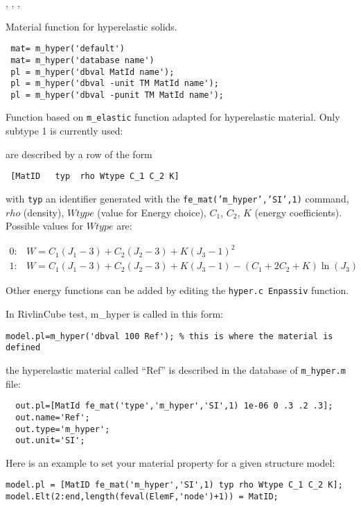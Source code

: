 
  , , \femat, \pheat


 Material function for hyperelastic solids.

\rsyntax\begin{verbatim}
 mat= m_hyper('default') 
 mat= m_hyper('database name') 
 pl = m_hyper('dbval MatId name');
 pl = m_hyper('dbval -unit TM MatId name');
 pl = m_hyper('dbval -punit TM MatId name');
\end{verbatim}


Function based on {\tt m\_elastic} function adapted for hyperelastic material. Only subtype 1 is currently used:


 are described by a row of the form

\begin{verbatim}
 [MatID   typ  rho Wtype C_1 C_2 K]
\end{verbatim}


\noindent with {\tt typ} an identifier generated with the {\tt fe\_mat('m\_hyper','SI',1)} command, $rho$ (density), $Wtype$ (value for Energy choice), $C_1$, $C_2$, $K$ (energy coefficients).\\
\noindent Possible values for $Wtype$ are:

$$
\begin{array}{ll}
0: & W = C_1(J_1-3) + C_2(J_2-3) + K(J_3-1)^2\\
1: & W = C_1(J_1-3) + C_2(J_2-3) + K(J_3-1) - (C_1 + 2C_2 + K)\ln(J_3)
\end{array}
$$

Other energy functions can be added by editing the {\tt hyper.c Enpassiv} function.

In RivlinCube test, m\_hyper is called in this form:
\begin{verbatim}
model.pl=m_hyper('dbval 100 Ref'); % this is where the material is defined
\end{verbatim}


the hyperelastic material called ``Ref'' is described in the database of {\tt m\_hyper.m} file:
\begin{verbatim}
  out.pl=[MatId fe_mat('type','m_hyper','SI',1) 1e-06 0 .3 .2 .3];
  out.name='Ref';
  out.type='m_hyper';
  out.unit='SI';
\end{verbatim}


Here is an example to set your material property for a given structure model:
\begin{verbatim}
model.pl = [MatID fe_mat('m_hyper','SI',1) typ rho Wtype C_1 C_2 K];
model.Elt(2:end,length(feval(ElemF,'node')+1)) = MatID;
\end{verbatim}


